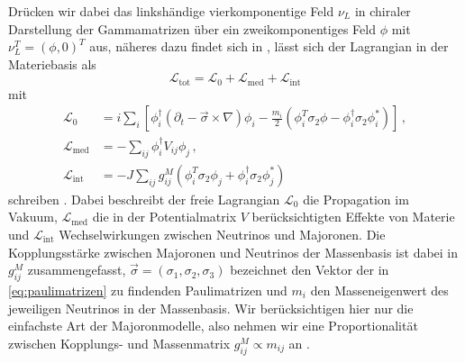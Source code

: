 Drücken wir dabei das linkshändige vierkomponentige Feld $\nu_L$ in chiraler Darstellung der Gammamatrizen über ein zweikomponentiges Feld $\phi$ mit $\nu^T_L = (\phi, 0)^T$ aus, 
näheres dazu findet sich in \cite{komponentendinger}, lässt sich der Lagrangian in der Materiebasis als
\begin{equation}
    \mathcal{L}_\text{tot} = \mathcal{L}_0 + \mathcal{L}_\text{med} + \mathcal{L}_\text{int}
    \label{eq:materielagrange}
\end{equation}
mit
\begin{align*}
    \mathcal{L}_0          &=   i \sum_i \left[\phi^\dagger_i \left(\partial_t - \vec{\sigma} \times \nabla \right) \phi_i - \frac{m_i}{2} \left(\phi^T_i \sigma_2 \phi - \phi^\dagger_i \sigma_2 \phi^*_i\right) \right] \,,\\
    \mathcal{L}_\text{med} &= - \sum_{i j} \phi^\dagger_i V_{i j} \phi_j  \,,\\
    \mathcal{L}_\text{int} &= - J \sum_{i j} g^M_{i j} \left( \phi^T_i \sigma_2 \phi_j + \phi^\dagger_i \sigma_2 \phi^*_j \right)
\end{align*}
schreiben \cite{päspaper}.
Dabei beschreibt der freie Lagrangian $\mathcal{L}_0$ die Propagation im Vakuum, $\mathcal{L}_\text{med}$ die in der Potentialmatrix $V$ berücksichtigten Effekte von Materie und $\mathcal{L}_\text{int}$ Wechselwirkungen zwischen Neutrinos und Majoronen.
Die Kopplungsstärke zwischen Majoronen und Neutrinos der Massenbasis ist dabei in $g^M_{i j}$ zusammengefasst, $\vec{\sigma} = (\sigma_1, \sigma_2, \sigma_3)$ bezeichnet den Vektor der in \eqref{eq:paulimatrizen} zu findenden Paulimatrizen
und $m_i$ den Masseneigenwert des jeweiligen Neutrinos in der Massenbasis.
Wir berücksichtigen hier nur die einfachste Art der Majoronmodelle, also nehmen wir eine Proportionalität zwischen Kopplungs- und Massenmatrix $g^M_{i j} \propto m_{i j}$ an \cite{päspaper}.

